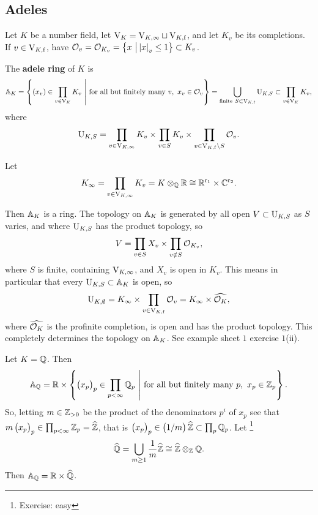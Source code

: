 \subsection{Adeles}

Let $ K $ be a number field, let $ \V_K = \V_{K, \infty} \sqcup \V_{K, \f} $, and let $ K_v $ be its completions. If $ v \in \V_{K, \f} $, have $ \OOO_v = \OOO_{K_v} = \cbr{x \st \abs{x}_v \le 1} \subset K_v $.

\begin{definition*}
The \textbf{adele ring} of $ K $ is
$$ \AA_K = \cbr{\br{x_v} \in \prod_{v \in \V_K} K_v \st \text{for all but finitely many} \ v, \ x_v \in \OOO_v} = \bigcup_{\text{finite} \ S \subset \V_{K, \f}} \U_{K, S} \subset \prod_{v \in \V_K} K_v, $$
where
$$ \U_{K, S} = \prod_{v \in \V_{K, \infty}} K_v \times \prod_{v \in S} K_v \times \prod_{v \in \V_{K, \f} \setminus S} \OOO_v. $$
\end{definition*}

\begin{notation*}
Let
$$ K_\infty = \prod_{v \in \V_{K, \infty}} K_v = K \otimes_\QQ \RR \cong \RR^{\r_1} \times \CC^{\r_2}. $$
\end{notation*}

Then $ \AA_K $ is a ring. The topology on $ \AA_K $ is generated by all open $ V \subset \U_{K, S} $ as $ S $ varies, and where $ \U_{K, S} $ has the product topology, so
$$ V = \prod_{v \in S} X_v \times \prod_{v \notin S} \OOO_{K_v}, $$
where $ S $ is finite, containing $ \V_{K, \infty} $, and $ X_v $ is open in $ K_v $. This means in particular that every $ \U_{K, S} \subset \AA_K $ is open, so
$$ \U_{K, \emptyset} = K_\infty \times \prod_{v \in \V_{K, \f}} \OOO_v = K_\infty \times \widehat{\OOO_K}, $$
where $ \widehat{\OOO_K} $ is the profinite completion, is open and has the product topology. This completely determines the topology on $ \AA_K $. See example sheet $ 1 $ exercise $ 1 $(ii).

\begin{example*}
Let $ K = \QQ $. Then
$$ \AA_\QQ = \RR \times \cbr{\br{x_p}_p \in \prod_{p < \infty} \QQ_p \st \text{for all but finitely many} \ p, \ x_p \in \ZZ_p}. $$
So, letting $ m \in \ZZ_{> 0} $ be the product of the denominators $ p^i $ of $ x_p $ see that $ m\br{x_p}_p \in \prod_{p < \infty} \ZZ_p = \widehat{\ZZ} $, that is $ \br{x_p}_p \in \br{1 / m}\widehat{\ZZ} \subset \prod_p \QQ_p $. Let \footnote{Exercise: easy}
$$ \widehat{\QQ} = \bigcup_{m \ge 1} \dfrac{1}{m}\widehat{\ZZ} \cong \widehat{\ZZ} \otimes_\ZZ \QQ. $$
Then $ \AA_\QQ = \RR \times \widehat{\QQ} $.
\end{example*}

